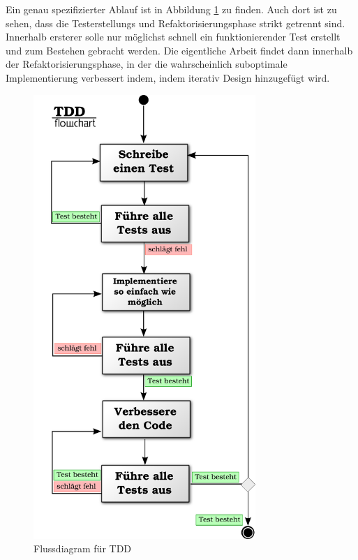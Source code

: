   
  Ein genau spezifizierter Ablauf ist in Abbildung \ref{fig:tddflow} zu finden. Auch dort ist zu sehen, dass die Testerstellungs und Refaktorisierungsphase strikt getrennt sind. Innerhalb ersterer solle nur möglichst schnell ein funktionierender Test erstellt und zum Bestehen gebracht werden. Die eigentliche Arbeit findet dann innerhalb der Refaktorisierungsphase, in der die wahrscheinlich suboptimale Implementierung verbessert indem, indem iterativ Design hinzugefügt wird.
  \begin{figure}[hp]
 \centering
 \includegraphics[width=0.75\textwidth]{./diagrams/tdd-flowchart.pdf}
 \caption{Flussdiagram für TDD}
 \label{fig:tddflow}
\end{figure}


